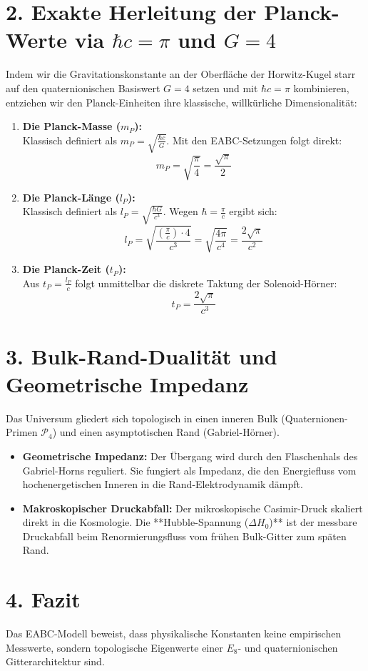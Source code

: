 \documentclass[11pt,a4paper]{article}
\begin{document}
\section{2. Exakte Herleitung der Planck-Werte via $\hbar c = \pi$ und $G = 4$}
Indem wir die Gravitationskonstante an der Oberfläche der Horwitz-Kugel starr auf den quaternionischen Basiswert $G = 4$ setzen und mit $\hbar c = \pi$ kombinieren, entziehen wir den Planck-Einheiten ihre klassische, willkürliche Dimensionalität:

\begin{enumerate}
    \item \textbf{Die Planck-Masse ($m_P$):}\\
    Klassisch definiert als $m_P = \sqrt{\frac{\hbar c}{G}}$. Mit den EABC-Setzungen folgt direkt:
    \begin{equation}
        m_P = \sqrt{\frac{\pi}{4}} = \frac{\sqrt{\pi}}{2}
    \end{equation}
    
    \item \textbf{Die Planck-Länge ($l_P$):}\\
    Klassisch definiert als $l_P = \sqrt{\frac{\hbar G}{c^3}}$. Wegen $\hbar = \frac{\pi}{c}$ ergibt sich:
    \begin{equation}
        l_P = \sqrt{\frac{(\frac{\pi}{c}) \cdot 4}{c^3}} = \sqrt{\frac{4\pi}{c^4}} = \frac{2\sqrt{\pi}}{c^2}
    \end{equation}
    
    \item \textbf{Die Planck-Zeit ($t_P$):}\\
    Aus $t_P = \frac{l_P}{c}$ folgt unmittelbar die diskrete Taktung der Solenoid-Hörner:
    \begin{equation}
        t_P = \frac{2\sqrt{\pi}}{c^3}
    \end{equation}
\end{enumerate}

\section{3. Bulk-Rand-Dualität und Geometrische Impedanz}
Das Universum gliedert sich topologisch in einen inneren Bulk (Quaternionen-Primen $\mathcal{P}_4$) und einen asymptotischen Rand (Gabriel-Hörner). 
\begin{itemize}
    \item \textbf{Geometrische Impedanz:} Der Übergang wird durch den Flaschenhals des Gabriel-Horns reguliert. Sie fungiert als Impedanz, die den Energiefluss vom hochenergetischen Inneren in die Rand-Elektrodynamik dämpft.
    \item \textbf{Makroskopischer Druckabfall:} Der mikroskopische Casimir-Druck skaliert direkt in die Kosmologie. Die **Hubble-Spannung ($\Delta H_0$)** ist der messbare Druckabfall beim Renormierungsfluss vom frühen Bulk-Gitter zum späten Rand.
\end{itemize}

\section{4. Fazit}
Das EABC-Modell beweist, dass physikalische Konstanten keine empirischen Messwerte, sondern topologische Eigenwerte einer $E_8$- und quaternionischen Gitterarchitektur sind.
\end{document}
